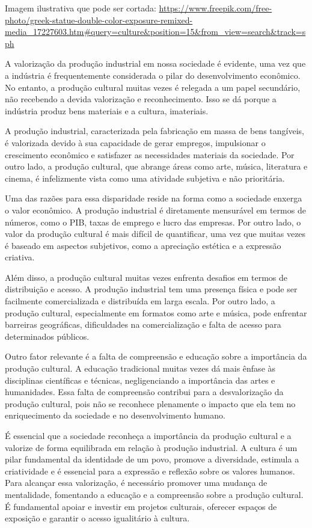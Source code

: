 \begin{itemize}
\begin{itemize}
\begin{escolha}
\begin{escolha}
\begin{escolha}
\begin{escolha}
\begin{escolha}
\begin{escolha}
\begin{escolha}
\begin{escolha}
Imagem ilustrativa que pode ser cortada:
\url{https://www.freepik.com/free-photo/greek-statue-double-color-exposure-remixed-media_17227603.htm\#query=culture\&position=15\&from_view=search\&track=sph}

A valorização da produção industrial em nossa sociedade é evidente, uma
vez que a indústria é frequentemente considerada o pilar do
desenvolvimento econômico. No entanto, a produção cultural muitas vezes
é relegada a um papel secundário, não recebendo a devida valorização e
reconhecimento. Isso se dá porque a indústria produz bens materiais e a
cultura, imateriais.

A produção industrial, caracterizada pela fabricação em massa de bens
tangíveis, é valorizada devido à sua capacidade de gerar empregos,
impulsionar o crescimento econômico e satisfazer as necessidades
materiais da sociedade. Por outro lado, a produção cultural, que abrange
áreas como arte, música, literatura e cinema, é infelizmente vista como
uma atividade subjetiva e não prioritária.

Uma das razões para essa disparidade reside na forma como a sociedade
enxerga o valor econômico. A produção industrial é diretamente
mensurável em termos de números, como o PIB, taxas de emprego e lucro
das empresas. Por outro lado, o valor da produção cultural é mais
difícil de quantificar, uma vez que muitas vezes é baseado em aspectos
subjetivos, como a apreciação estética e a expressão criativa.

Além disso, a produção cultural muitas vezes enfrenta desafios em termos
de distribuição e acesso. A produção industrial tem uma presença física
e pode ser facilmente comercializada e distribuída em larga escala. Por
outro lado, a produção cultural, especialmente em formatos como arte e
música, pode enfrentar barreiras geográficas, dificuldades na
comercialização e falta de acesso para determinados públicos.

Outro fator relevante é a falta de compreensão e educação sobre a
importância da produção cultural. A educação tradicional muitas vezes dá
mais ênfase às disciplinas científicas e técnicas, negligenciando a
importância das artes e humanidades. Essa falta de compreensão contribui
para a desvalorização da produção cultural, pois não se reconhece
plenamente o impacto que ela tem no enriquecimento da sociedade e no
desenvolvimento humano.

É essencial que a sociedade reconheça a importância da produção cultural
e a valorize de forma equilibrada em relação à produção industrial. A
cultura é um pilar fundamental da identidade de um povo, promove a
diversidade, estimula a criatividade e é essencial para a expressão e
reflexão sobre os valores humanos. Para alcançar essa valorização, é
necessário promover uma mudança de mentalidade, fomentando a educação e
a compreensão sobre a produção cultural. É fundamental apoiar e investir
em projetos culturais, oferecer espaços de exposição e garantir o acesso
igualitário à cultura.


\end{escolha}
\end{escolha}
\end{escolha}
\end{escolha}
\end{escolha}
\end{escolha}
\end{escolha}
\end{escolha}
\end{itemize}
\end{itemize}
